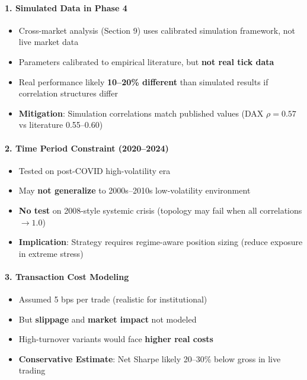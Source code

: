 \paragraph{1. Simulated Data in Phase 4}
\begin{itemize}
\item Cross-market analysis (Section 9) uses calibrated simulation framework, not live market data
\item Parameters calibrated to empirical literature, but \textbf{not real tick data}
\item Real performance likely \textbf{10--20\% different} than simulated results if correlation structures differ
\item \textbf{Mitigation}: Simulation correlations match published values (DAX $\rho = 0.57$ vs literature 0.55--0.60)
\end{itemize}

\paragraph{2. Time Period Constraint (2020--2024)}
\begin{itemize}
\item Tested on post-COVID high-volatility era
\item May \textbf{not generalize} to 2000s--2010s low-volatility environment
\item \textbf{No test} on 2008-style systemic crisis (topology may fail when all correlations $\rightarrow 1.0$)
\item \textbf{Implication}: Strategy requires regime-aware position sizing (reduce exposure in extreme stress)
\end{itemize}

\paragraph{3. Transaction Cost Modeling}
\begin{itemize}
\item Assumed 5 bps per trade (realistic for institutional)
\item But \textbf{slippage} and \textbf{market impact} not modeled
\item High-turnover variants would face \textbf{higher real costs}
\item \textbf{Conservative Estimate}: Net Sharpe likely 20--30\% below gross in live trading
\end{itemize}

